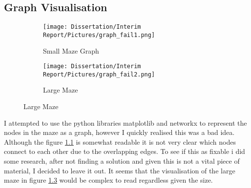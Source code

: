 \documentclass[]{final_report}
\begin{document}
\newpage
{}

\label{endpage}

\newpage

\begin{appendices}
\chapter{Graph Visualisation}\label{Graph visualisation}
\begin{figure}[h]
     \caption{Graph Representation of maze}
     \centering
     \begin{subfigure}[h]{1\textwidth}
         \centering
         \texttt{[image: Dissertation/Interim Report/Pictures/graph\_fail1.png]}
         \caption{Small Maze Graph}
         \label{fig: Small Maze graph}
     \end{subfigure}
     \hfill
     \begin{subfigure}[h]{1\textwidth}
         \centering
         \texttt{[image: Dissertation/Interim Report/Pictures/graph\_fail2.png]}
         \caption{Large Maze}
         \label{fig: Large Maze Graph}
     \end{subfigure}
\end{figure}

I attempted to use the python libraries matplotlib and networkx to represent the nodes in the maze as a graph, however I quickly realised this was a bad idea. Although the figure \ref{fig: Small Maze graph} is somewhat readable it is not very clear which nodes connect to each other due to the overlapping edges. To see if this as fixable i did some research, after not finding a solution and given this is not a vital piece of material, I decided to leave it out. It seems that the visualisation of the large maze in figure \ref{fig: Large Maze Graph} would be complex to read regardless given the size.
\end{appendices}
\end{document}
